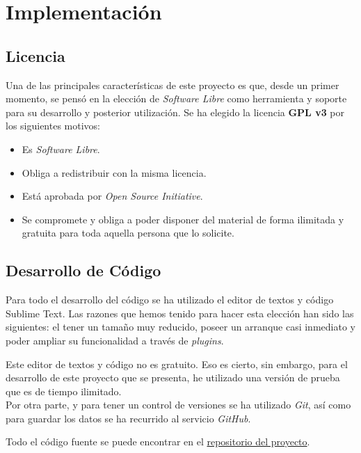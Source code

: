 \section{Implementación}
\subsection{Licencia}
Una de las principales características de este proyecto es que, desde un primer momento, se pensó en la elección de \textit{Software Libre} como herramienta y soporte para su desarrollo y posterior utilización. Se ha elegido  la licencia \textbf{GPL v3} por los siguientes motivos:

\begin{itemize}
  \item Es \textit{Software Libre}.
  \item Obliga a redistribuir con la misma licencia.
  \item Está aprobada por \textit{Open Source Initiative}.
  \item Se compromete y obliga a poder disponer del material de forma ilimitada y gratuita para toda aquella persona que lo solicite.
\end{itemize}

\subsection{Desarrollo de Código}
Para todo el desarrollo del código se ha utilizado el editor de textos y código Sublime Text\cite{Sublime}.
Las razones que hemos tenido para hacer esta elección han sido las siguientes: el tener un tamaño muy reducido, poseer un arranque casi inmediato y poder ampliar su funcionalidad a través de \textit{plugins}.

Este editor de textos y código no es gratuito. Eso es cierto, sin embargo, para el desarrollo de este proyecto que se presenta, he utilizado una versión de prueba que es de tiempo ilimitado.\cite{BeneficiosSublime}\\

Por otra parte, y para tener un control de versiones se ha utilizado \textit{Git}, así como para guardar los datos se ha recurrido al servicio \textit{GitHub}\cite{GitHub}.

Todo el código fuente se puede encontrar en el \href{https://github.com/PabloTorrecillas/IndiWebClient}{repositorio del proyecto}.
